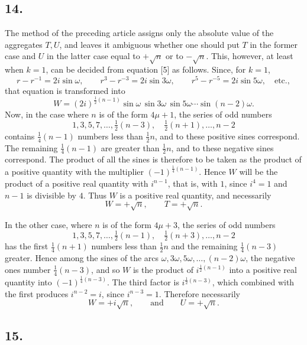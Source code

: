 \documentclass[12pt]{article}
\begin{document}
\subsection*{14.}

The method of the preceding article assigns only the absolute value of the aggregates $T,U$, and leaves it ambiguous whether one should put $T$ in the former case and $U$ in the latter case equal to $+\sqrt n$ or to $-\sqrt n$. This, however, at least when $k=1$, can be decided from equation [5] as follows. Since, for $k=1$,
\[
r-r^{-1}=2i\sin\omega,\qquad
r^3-r^{-3}=2i\sin3\omega,\qquad
r^5-r^{-5}=2i\sin5\omega,\quad\text{etc.},
\]
that equation is transformed into
\[
W=(2i)^{\frac12(n-1)}\sin\omega\,\sin3\omega\,\sin5\omega\cdots\sin(n-2)\omega.
\]
Now, in the case where $n$ is of the form $4\mu+1$, the series of odd numbers
\[
1,3,5,7,\ldots,\tfrac12(n-3),\quad \tfrac12(n+1),\ldots,n-2
\]
contains $\tfrac14(n-1)$ numbers less than $\tfrac12 n$, and to these positive sines correspond. The remaining $\tfrac14(n-1)$ are greater than $\tfrac12 n$, and to these negative sines correspond. The product of all the sines is therefore to be taken as the product of a positive quantity with the multiplier $(-1)^{\frac14(n-1)}$. Hence $W$ will be the product of a positive real quantity with $i^{n-1}$, that is, with $1$, since $i^4=1$ and $n-1$ is divisible by $4$. Thus $W$ is a positive real quantity, and necessarily
\[
W=+\sqrt n,\qquad T=+\sqrt n.
\]

In the other case, where $n$ is of the form $4\mu+3$, the series of odd numbers
\[
1,3,5,7,\ldots,\tfrac12(n-1),\quad \tfrac12(n+3),\ldots,n-2
\]
has the first $\tfrac14(n+1)$ numbers less than $\tfrac12 n$ and the remaining $\tfrac14(n-3)$ greater. Hence among the sines of the arcs $\omega,3\omega,5\omega,\ldots,(n-2)\omega$, the negative ones number $\tfrac14(n-3)$, and so $W$ is the product of $i^{\frac12(n-1)}$ into a positive real quantity into $(-1)^{\frac14(n-3)}$. The third factor is $i^{\frac12(n-3)}$, which combined with the first produces $i^{n-2}=i$, since $i^{n-3}=1$. Therefore necessarily
\[
W=+i\sqrt n,\qquad\text{and}\qquad U=+\sqrt n.
\]

\subsection*{15.}
\end{document}
